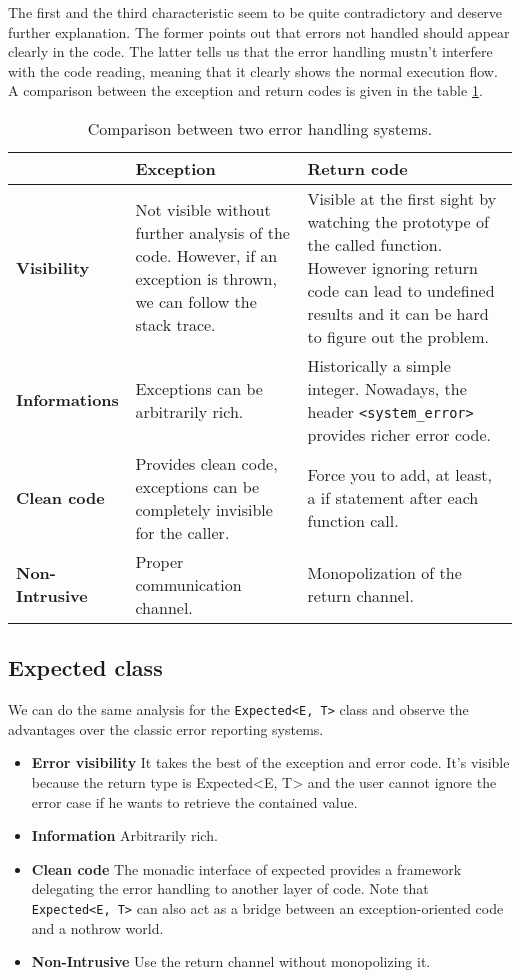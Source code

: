 \documentclass[a4paper,10pt]{article}
\newcommand{\cpp}[1]{\lstinline{#1}}
\begin{document}
The first and the third characteristic seem to be quite contradictory and deserve further explanation. The former points out that errors not handled should appear clearly in the code. The latter tells us that the error handling mustn't interfere with the code reading, meaning that it clearly shows the normal execution flow. A comparison between the exception and return codes is given in the table \ref{comp-handling-error}.

\begin{table}[h!]
\centering
\bgroup
\def\arraystretch{1.5}
\begin{tabular}{|l|>{\raggedright\arraybackslash}p{5cm}|>{\raggedright\arraybackslash}p{5cm}|}
\hline
                    & \textbf{Exception} & \textbf{Return code} \\
\hline
\textbf{Visibility} & Not visible without further analysis of the code. However, if an exception is thrown, we can follow the stack trace. & Visible at the first sight by watching the prototype of the called function. However ignoring return code can lead to undefined results and it can be hard to figure out the problem. \\
\hline
\textbf{Informations} & Exceptions can be arbitrarily rich. & Historically a simple integer. Nowadays, the header \cpp{<system_error>} provides richer error code. \\
\hline
\textbf{Clean code} & Provides clean code, exceptions can be completely invisible for the caller. & Force you to add, at least, a if statement after each function call. \\
\hline
\textbf{Non-Intrusive} & Proper communication channel. & Monopolization of the return channel. \\
\hline
\end{tabular}
\egroup
\caption{Comparison between two error handling systems.}
\label{comp-handling-error}
\end{table}

\subsection{Expected class}

We can do the same analysis for the \cpp{Expected<E, T>} class and observe the advantages over the classic error reporting systems.

\begin{itemize}
 \item \textbf{Error visibility} It takes the best of the exception and error code. It's visible because the return type is Expected<E, T> and the user cannot ignore the error case if he wants to retrieve the contained value.
 \item \textbf{Information} Arbitrarily rich.
 \item \textbf{Clean code} The monadic interface of expected provides a framework delegating the error handling to another layer of code. Note that \cpp{Expected<E, T>} can also act as a bridge between an exception-oriented code and a nothrow world.
 \item \textbf{Non-Intrusive} Use the return channel without monopolizing it.
\end{itemize}
\end{document}
